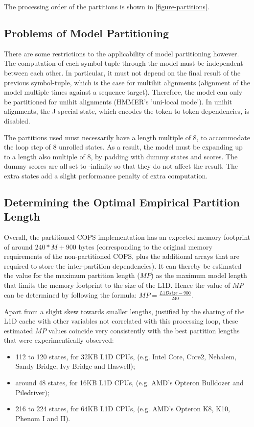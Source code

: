 The processing order of the partitions is shown in \autoref{figure-partitions}.



\subsection{Problems of Model Partitioning}

There are some restrictions to the applicability of model partitioning however. The computation of each symbol-tuple through the model must be independent between each other. In particular, it must not depend on the final result of the previous symbol-tuple, which is the case for multihit alignments (alignment of the model multiple times against a sequence target). Therefore, the model can only be partitioned for unihit alignments (HMMER's 'uni-local mode'). In unihit alignments, the J special state, which encodes the token-to-token dependencies, is disabled.

The partitions used must necessarily have a length multiple of 8, to accommodate the loop step of 8 unrolled states. As a result, the model must be expanding up to a length also multiple of 8, by padding with dummy states and scores. The dummy scores are all set to -infinity so that they do not affect the result. The extra states add a slight performance penalty of extra computation.



\subsection{Determining the Optimal Empirical Partition Length}

Overall, the partitioned COPS implementation has an expected memory footprint of around $240*M + 900$ bytes (corresponding to the original memory requirements of the non-partitioned COPS, plus the additional arrays that are required to store the inter-partition dependencies). It can thereby be estimated the value for the maximum partition length ($MP$) as the maximum model length that limits the memory footprint to the size of the L1D. Hence the value of $MP$ can be determined by following the formula: $ MP = \frac{\displaystyle L1Dsize - 900}{\displaystyle 240} $.

Apart from a slight skew towards smaller lengths, justified by the sharing of the L1D cache with other variables not correlated with this processing loop, these estimated $MP$ values coincide very consistently with the best partition lengths that were experimentically observed:
\begin{itemize}[noitemsep,nolistsep]
\item 112 to 120 states, for 32KB L1D CPUs, (e.g. Intel Core, Core2, Nehalem, Sandy Bridge, Ivy Bridge and Haswell);
\item around 48  states, for 16KB L1D CPUs, (e.g. AMD's Opteron Bulldozer and Piledriver);
\item 216 to 224 states, for 64KB L1D CPUs, (e.g. AMD's Opteron K8, K10, Phenom I and II).
\end{itemize}

